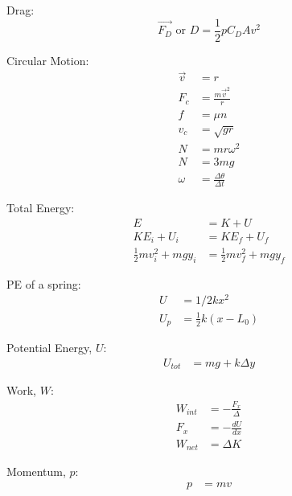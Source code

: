 \documentclass[10pt, letterpaper]{book}
\begin{document}
\begin{multicols*}{2}
        Drag: 
        \begin{equation}
            \vec{F_D}\text{ or }D = \frac{1}{2}p C_{D}Av^{2}
        \end{equation}

        Circular Motion:
        \begin{align}
            \vec{v}         & = r                               \\
            F_{c}           & =\frac{m\vec{v}^{2}}{r}           \\
            f               & = \mu n                           \\
            v_{c}           & = \sqrt{gr}                       \\
            N               & = mr\omega^{2}                    \\
            N               & = 3mg                             \\
            \omega          & = \frac{\Delta \theta}{\Delta t}  
        \end{align}

        Total Energy:
        \begin{align}
            E   & = K + U   \\
            KE_{i} + U_{i}  & = KE_{f} + U_{f}  \\
            \frac{1}{2}mv^{2}_{i} + mgy_{i} & = \frac{1}{2}mv^{2}_{f} + mgy_{f}
        \end{align}

        PE of a spring:
        \begin{align}
            U     & = 1/2kx^{2}                 \\
            U_{p} & = \frac{1}{2}k(x-L_{0})
        \end{align}

        Potential Energy, $U$:
        \begin{align}
            U_{tot} & = mg + k\Delta y 
        \end{align}

        Work, $W$:
        \begin{align}
            W_{int} & = -\frac{F_{x}}{\Delta }  \\
            F_{x}   & = -\frac{dU}{dx}          \\
            W_{net} & = \Delta K
        \end{align} 

        Momentum, $p$:
        \begin{align}
            p    & = mv
        \end{align}


\end{multicols*}
\end{document}
